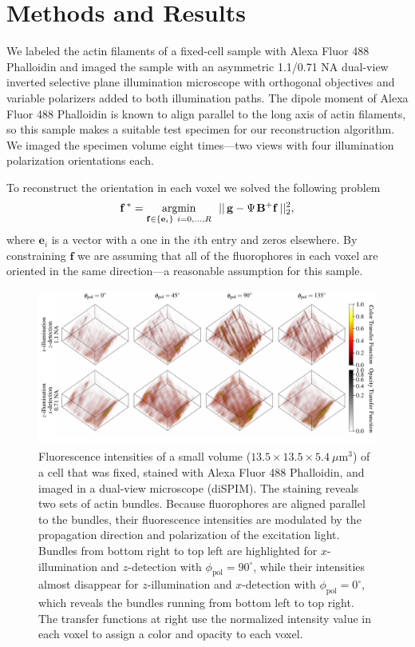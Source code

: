 \documentclass[letterpaper,10pt]{article}
\begin{document}
\section{Methods and Results}
We labeled the actin filaments of a fixed-cell sample with Alexa Fluor 488
Phalloidin and imaged the sample with an asymmetric 1.1/0.71 NA dual-view
inverted selective plane illumination microscope with orthogonal objectives
\cite{wu2017} and variable polarizers added to both illumination paths. The
dipole moment of Alexa Fluor 488 Phalloidin is known to align parallel to the
long axis of actin filaments, so this sample makes a suitable test specimen for
our reconstruction algorithm. We imaged the specimen volume eight times---two
views with four illumination polarization orientations each.

To reconstruct the orientation in each voxel we solved the following problem 
\begin{align}
\mathbf{f^{\thinspace *}}= \underset{\mathbf{f}\in\{\mathbf{e}_i\}\ i = 0,\dotsc,R}{\text{argmin}}
\ \ ||\thinspace\mathbf{g} - \Psi\hspace{0.1em}\mathbf{B}^+\mathbf{f}\thinspace||_2^2,
\end{align}
where $\mathbf{e}_i$ is a vector with a one in the $i$th entry and zeros
elsewhere. By constraining $\mathbf{f}$ we are assuming that all of the
fluorophores in each voxel are oriented in the same direction---a reasonable
assumption for this sample.
\begin{figure}[htbp]
  \centering
  \includegraphics[width=16.cm, trim={0.1cm 1.3cm 0 0.5cm}]{figs/roi2/data.pdf}
  \caption{Fluorescence intensities of a small volume
    ($13.5\times 13.5\times 5.4\ \mu$m${}^3$) of a cell that was fixed, stained
    with Alexa Fluor 488 Phalloidin, and imaged in a dual-view microscope
    (diSPIM). The staining reveals two sets of actin bundles. Because
    fluorophores are aligned parallel to the bundles, their fluorescence
    intensities are modulated by the propagation direction and polarization of
    the excitation light. Bundles from bottom right to top left are highlighted
    for $x$-illumination and $z$-detection with
    $\phi_{\text{pol}} = 90^{\circ}$, while their intensities almost disappear
    for $z$-illumination and $x$-detection with $\phi_{\text{pol}} = 0^{\circ}$,
    which reveals the bundles running from bottom left to top right. The
    transfer functions at right use the normalized intensity value in each voxel
    to assign a color and opacity to each voxel.}
\end{figure}
\end{document}
